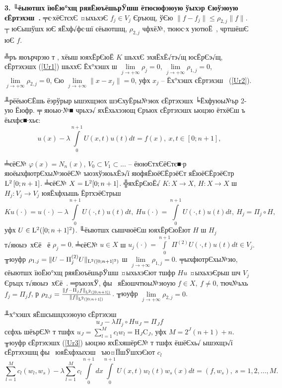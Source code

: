 \documentclass[12pt, a4paper, oneside]{article}
\begin{document}
\noindent \textbf{3. ╙ёыютшх їюЁю°хщ ряяЁюъёшьрЎшш ётюсюфэюую ўыхэр Єюўэюую єЁртэхэш .} ╤є∙хёЄтєхЄ ¤ыхьхэЄ $f_j \in V_j$ Єръющ, ўЄю $\|f-f_j\|\leqslant \rho_{2,j}\|f\|$. ┬ юЄышўшх юЄ яЁхф√фє∙шї єёыютшщ, $\rho_{2,j}$ чфхё№, тююс∙х уютюЁ , чртшёшЄ юЄ $f$.

╩ръ яюърчрэю т \cite{Akilov}, хёыш юяхЁрЄюЁ $K$ шьххЄ эхяЁхЁ√тэ√щ юсЁрЄэ√щ, єЁртэхэшх (\ref{Ur1}) шьххЄ Ёх°хэшх ш $\lim\limits_{j\to +\infty} \rho_j = 0$,  $\lim\limits_{j\to +\infty} \rho_{1,j} = 0$,  $\lim\limits_{j\to +\infty} \rho_{2,j} = 0$, Єю  $\lim\limits_{j\to +\infty} \|x-x_j\| = 0$, уфх $x_j$ -- Ёх°хэшх єЁртэхэш  (\ref{Ur2}).
\par ╨рёёьюЄЁшь ёэрўрыр ышэхщэюх шэЄхуЁры№эюх єЁртэхэшх ╘Ёхфуюы№ьр 2-ую Ёюфр. ╤ яюью∙№■ чрьхэ√ яхЁхьхээющ Єръюх єЁртэхэшх ьюцэю ётхёЄш ъ ёыхфє■∙хьє:
\begin{equation}\label{U313}
u(x)-\lambda\int\limits_{0}^{n+1}U(x,t)u(t)dt =f(x),~x,t\in [0;n+1],
\end{equation}
\par ╧єёЄ№ $\varphi(x)=N_n(x)$, $V_{0} \subset V_{1} \subset ...$ -- ёююЄтхЄёЄтє■∙р  яюёыхфютрЄхы№эюёЄ№ ъюэхўэюьхЁэ√ї яюфяЁюёЄЁрэёЄт яЁюёЄЁрэёЄтр ${\rm L}^{2} \left[0;n+1\right]$. ╧єёЄ№ $X={\rm L}^2[0;n+1]$. ╬яхЁрЄюЁ√ $K:X\to X$, $H:X\to X$ ш $H_j : V_j\to V_j$ юяЁхфхышь ЁртхэёЄтрьш
\[
Ku(\cdot)=u(\cdot)-\lambda\int\limits_0^{n+1} U(\cdot,t)u(t)dt,~Hu(\cdot)=\int\limits_0^{n+1} U(\cdot,t)u(t)dt,~H_j=\Pi_j\circ H,
\]
уфх $U\in {\rm L}^2([0;n+1]^2)$. ╙ёыютшх сышчюёЄш юяхЁрЄюЁют $H$ ш $H_j$ т√яюыэ хЄё  ё $\rho_j=0$. ╧єёЄ№  $u\in X$ ш $u_j(\cdot)=\int\limits_0^{n+1} \Pi^{(2)}U(\cdot,t)u(t)dt\in V_j$. ╥юуфр $\rho_{1,j}=\|U-\Pi_j^{(2)}U\|_{{\rm L}^2([0;n+1]^2)}$ ш $\lim\limits_{j\to +\infty} \rho_{1,j}=0$. ╤ыхфютрЄхы№эю, єёыютшх їюЁю°хщ ряяЁюъёшьрЎшш ¤ыхьхэЄют тшфр $Hu$ ¤ыхьхэЄрьш шч $V_j$ Єръцх т√яюыэ хЄё . ═ръюэхЎ, фы  яЁюшчтюы№эюую $f\in X,~f\ne 0$, тюч№ьхь $f_j=\Pi_j f$, р $\rho_{2,j}=\frac{\|f-\Pi_j f\|_{{\rm L}^2([0;n+1])}}{\|f\|_{{\rm L}^2([0;n+1])}}$. ╥юуфр $\lim\limits_{j\to +\infty} \rho_{2,j}=0$. \par ╨х°хэшх яЁшсышцхээюую єЁртэхэш 
\begin{equation}\label{Ur3}
u_J-\lambda\Pi_j\circ H u_J=\Pi_J f
\end{equation}
сєфхь шёърЄ№ т тшфх $u_J=\sum\limits_{l=1}^{M} c_l w_l = \mathrm{H}_J\mathrm{C}_J $, уфх $M=2^{J}(n+1)+n$. ╥юуфр єЁртэхэшх (\ref{Ur3}) ьюцэю яхЁхяшёрЄ№ т тшфх
ёшёЄхь√ ышэхщэ√ї єЁртэхэшщ фы  юяЁхфхыхэш  ъю¤ЇЇшЎшхэЄют $c_l$
\begin{equation}\label{U315}
\sum\limits_{l=1}^{M} c_l (w_l,w_s)-\lambda\sum\limits_{l=1}^{M} c_l \int\limits_{0}^{n+1}dx\int\limits_{0}^{n+1}U(x,t)w_l(t)w_s(x)dt =(f,w_s),~s=1,2,\dots,M.
\end{equation}
\end{document}
